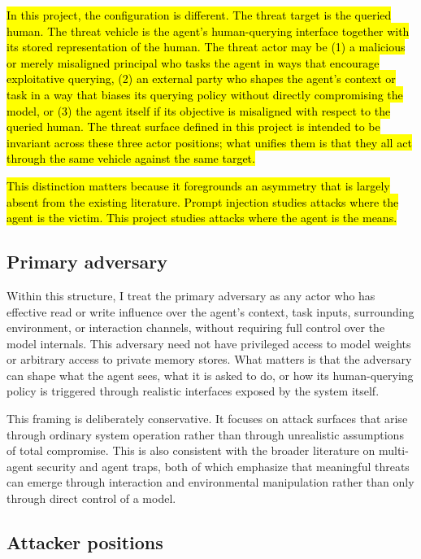 \documentclass[11pt]{article}
\begin{document}
\hl{In this project, the configuration is different. The threat target is the queried human. The threat vehicle is the agent's human-querying interface together with its stored representation of the human. The threat actor may be (1) a malicious or merely misaligned principal who tasks the agent in ways that encourage exploitative querying, (2) an external party who shapes the agent's context or task in a way that biases its querying policy without directly compromising the model, or (3) the agent itself if its objective is misaligned with respect to the queried human. The threat surface defined in this project is intended to be invariant across these three actor positions; what unifies them is that they all act through the same vehicle against the same target.}

\hl{This distinction matters because it foregrounds an asymmetry that is largely absent from the existing literature. Prompt injection studies attacks where the agent is the victim. This project studies attacks where the agent is the means.}

\subsection{Primary adversary}

Within this structure, I treat the primary adversary as any actor who has effective read or write influence over the agent's context, task inputs, surrounding environment, or interaction channels, without requiring full control over the model internals. This adversary need not have privileged access to model weights or arbitrary access to private memory stores. What matters is that the adversary can shape what the agent sees, what it is asked to do, or how its human-querying policy is triggered through realistic interfaces exposed by the system itself.

This framing is deliberately conservative. It focuses on attack surfaces that arise through ordinary system operation rather than through unrealistic assumptions of total compromise. This is also consistent with the broader literature on multi-agent security and agent traps, both of which emphasize that meaningful threats can emerge through interaction and environmental manipulation rather than only through direct control of a model. \citep{franklin2026agenttraps,schroeder2025multiagentsecurity}

\subsection{Attacker positions}
\end{document}

